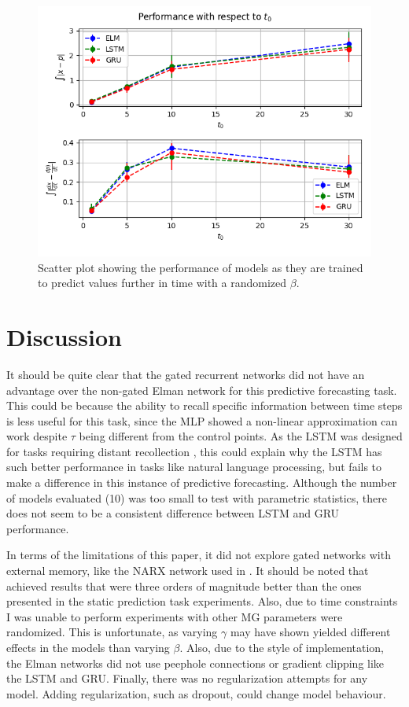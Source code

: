 \documentclass[11pt]{article}
\begin{document}
  \begin{figure}
    \begin{center}
   \includegraphics[width=.96\textwidth]{figures/mg2_save.png}      
    \caption{Scatter plot showing the performance of models  as they are trained to predict values further
      in time with a randomized $\beta$.}
    \label{fig:mg2_save}
    \end{center}
  \end{figure}

\section {Discussion}
It should be quite clear that the gated recurrent networks did not have
an advantage over the non-gated Elman network for this predictive
forecasting task. This could be because the ability to recall specific 
information between time steps is less useful for this task, since the
MLP showed a non-linear approximation can work despite $\tau$ being
different from the control points. As the LSTM was designed for tasks requiring distant recollection
\cite{LSTM}, this could explain why the LSTM has such better
performance in tasks like natural language processing, but fails to make a difference in this
instance of predictive forecasting. Although the number of models
evaluated (10) was too small to test with parametric statistics, there
does not seem to be a consistent difference between LSTM and GRU performance.

In terms of the limitations of this paper, it did not explore gated
networks with external memory, like the NARX network used in
\cite{Farsa}. It should be noted that \cite{Farsa} achieved results
that were three orders of magnitude better than the ones presented in the static
prediction task experiments. Also, due to
time constraints I was unable to perform experiments with other MG
parameters were randomized. This is unfortunate, as varying $\gamma$
may have shown yielded different effects in the models than varying $\beta$. Also, due to
the style of implementation, the Elman networks did not use peephole
connections or gradient clipping like the LSTM and GRU. Finally, there
was no regularization attempts for any model. Adding regularization, such as dropout, could change model behaviour.
\end{document}
